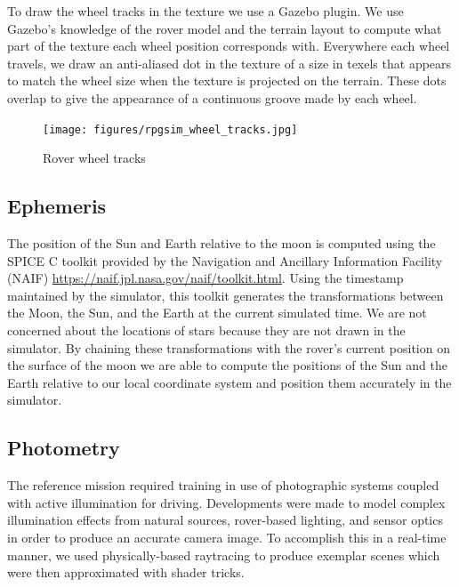 \documentclass[twocolumn,letterpaper]{IEEEAerospaceCLS}  %
\begin{document}
To draw the wheel tracks in the texture we use a Gazebo plugin. 
We use Gazebo's knowledge of the rover model and the terrain layout to compute what part of the texture each wheel position corresponds with. 
Everywhere each wheel travels, we draw an anti-aliased dot in the texture of a size in texels that appears to match the wheel size when the texture is projected on the terrain. 
These dots overlap to give the appearance of a continuous groove made by each wheel.
\begin{figure}[h!]
  \texttt{[image: figures/rpgsim\_wheel\_tracks.jpg]}
  \caption{Rover wheel tracks}
  \label{fig:wheeltracks}
\end{figure}

\subsection{Ephemeris}
The position of the Sun and Earth relative to the moon is computed using the SPICE C toolkit provided by the Navigation and Ancillary Information Facility (NAIF) \url{https://naif.jpl.nasa.gov/naif/toolkit.html}.  
Using the timestamp maintained by the simulator, this toolkit generates the transformations between the Moon, the Sun, and the Earth at the current simulated time.  
We are not concerned about the locations of stars because they are not drawn in the simulator.
By chaining these transformations with the rover's current position on the surface of the moon we are able to compute the positions of the Sun and the Earth relative to our local coordinate system and position them accurately in the simulator.  

\subsection {Photometry}
The reference mission required training in use of photographic systems coupled with active illumination for driving. 
Developments were made to model complex illumination effects from natural sources, rover-based lighting, and sensor optics in order to produce an accurate camera image. 
To accomplish this in a real-time manner, we used physically-based raytracing to produce exemplar scenes which were then approximated with shader tricks. 
\end{document}
